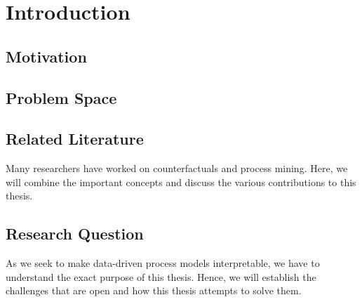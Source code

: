 \documentclass[12pt,a4paper]{report}
\begin{document}




\tableofcontents
\printglossary[type=acronym, title=List of terms, toctitle=List of terms]


\chapter{Introduction}
\label{sec:intro}

\section{Motivation}
\label{sec:motivation}


\section{Problem Space}
\label{sec:challenges}


% 

\section{Related Literature}
\label{sec:literature}
Many researchers have worked on counterfactuals and process mining. Here, we will combine the important concepts and discuss the various contributions to this thesis.



\section{Research Question}
\label{sec:rq}
As we seek to make data-driven process models interpretable, we have to understand the exact purpose of this thesis. Hence, we will establish the challenges that are open and how this thesis attempts to solve them. 



\end{document}
